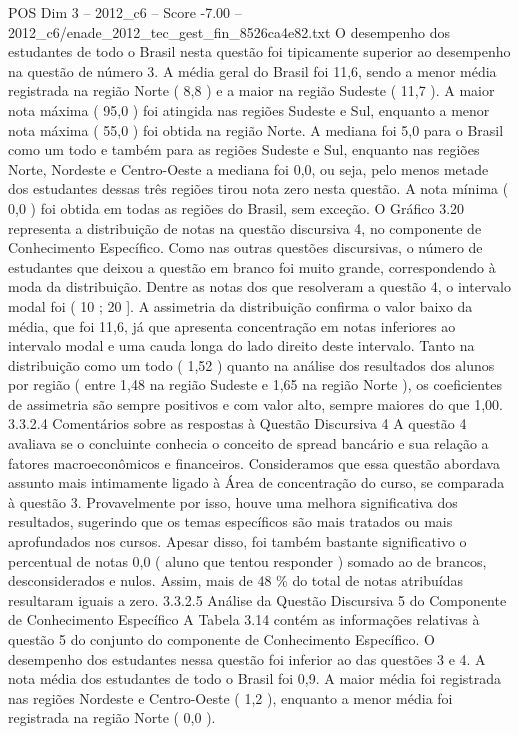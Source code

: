 \begin{textsample}{POS Dim 3 – 2012\_c6 – Score -7.00 – 2012\_c6/enade\_2012\_tec\_gest\_fin\_8526ca4e82.txt}
O desempenho dos estudantes de todo o Brasil nesta questão foi tipicamente superior ao desempenho na questão de número 3.
A média geral do Brasil foi 11,6, sendo a menor média registrada na região Norte ( 8,8 ) e a maior na região Sudeste ( 11,7 ).
A maior nota máxima ( 95,0 ) foi atingida nas regiões Sudeste e Sul, enquanto a menor nota máxima ( 55,0 ) foi obtida na região Norte.
A mediana foi 5,0 para o Brasil como um todo e também para as regiões Sudeste e Sul, enquanto nas regiões Norte, Nordeste e Centro-Oeste a mediana foi 0,0, ou seja, pelo menos metade dos estudantes dessas três regiões tirou nota zero nesta questão.
A nota mínima ( 0,0 ) foi obtida em todas as regiões do Brasil, sem exceção.
O Gráfico 3.20 representa a distribuição de notas na questão discursiva 4, no componente de Conhecimento Específico.
Como nas outras questões discursivas, o número de estudantes que deixou a questão em branco foi muito grande, correspondendo à moda da distribuição.
Dentre as notas dos que resolveram a questão 4, o intervalo modal foi ( 10 ; 20 ].
A assimetria da distribuição confirma o valor baixo da média, que foi 11,6, já que apresenta concentração em notas inferiores ao intervalo modal e uma cauda longa do lado direito deste intervalo.
Tanto na distribuição como um todo ( 1,52 ) quanto na análise dos resultados dos alunos por região ( entre 1,48 na região Sudeste e 1,65 na região Norte ), os coeficientes de assimetria são sempre positivos e com valor alto, sempre maiores do que 1,00. 3.3.2.4 Comentários sobre as respostas à Questão Discursiva 4 A questão 4 avaliava se o concluinte conhecia o conceito de spread bancário e sua relação a fatores macroeconômicos e financeiros.
Consideramos que essa questão abordava assunto mais intimamente ligado à Área de concentração do curso, se comparada à questão 3.
Provavelmente por isso, houve uma melhora significativa dos resultados, sugerindo que os temas específicos são mais tratados ou mais aprofundados nos cursos.
Apesar disso, foi também bastante significativo o percentual de notas 0,0 ( aluno que tentou responder ) somado ao de brancos, desconsiderados e nulos.
Assim, mais de 48 \% do total de notas atribuídas resultaram iguais a zero. 3.3.2.5 Análise da Questão Discursiva 5 do Componente de Conhecimento Específico A Tabela 3.14 contém as informações relativas à questão 5 do conjunto do componente de Conhecimento Específico.
O desempenho dos estudantes nessa questão foi inferior ao das questões 3 e 4.
A nota média dos estudantes de todo o Brasil foi 0,9.
A maior média foi registrada nas regiões Nordeste e Centro-Oeste ( 1,2 ), enquanto a menor média foi registrada na região Norte ( 0,0 ).

\end{textsample}
